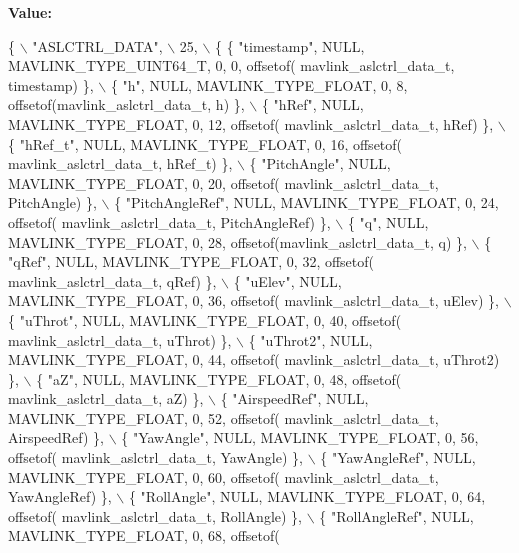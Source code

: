 {\bfseries Value\+:}
\begin{DoxyCode}
\{ \(\backslash\)
    \textcolor{stringliteral}{"ASLCTRL\_DATA"}, \(\backslash\)
    25, \(\backslash\)
    \{  \{ \textcolor{stringliteral}{"timestamp"}, NULL, MAVLINK_TYPE_UINT64_T, 0, 0, offsetof(
      mavlink_aslctrl_data_t, timestamp) \}, \(\backslash\)
         \{ \textcolor{stringliteral}{"h"}, NULL, MAVLINK_TYPE_FLOAT, 0, 8, offsetof(mavlink_aslctrl_data_t, h) \}, \(\backslash\)
         \{ \textcolor{stringliteral}{"hRef"}, NULL, MAVLINK_TYPE_FLOAT, 0, 12, offsetof(
      mavlink_aslctrl_data_t, hRef) \}, \(\backslash\)
         \{ \textcolor{stringliteral}{"hRef\_t"}, NULL, MAVLINK_TYPE_FLOAT, 0, 16, offsetof(
      mavlink_aslctrl_data_t, hRef\_t) \}, \(\backslash\)
         \{ \textcolor{stringliteral}{"PitchAngle"}, NULL, MAVLINK_TYPE_FLOAT, 0, 20, offsetof(
      mavlink_aslctrl_data_t, PitchAngle) \}, \(\backslash\)
         \{ \textcolor{stringliteral}{"PitchAngleRef"}, NULL, MAVLINK_TYPE_FLOAT, 0, 24, offsetof(
      mavlink_aslctrl_data_t, PitchAngleRef) \}, \(\backslash\)
         \{ \textcolor{stringliteral}{"q"}, NULL, MAVLINK_TYPE_FLOAT, 0, 28, offsetof(mavlink_aslctrl_data_t, q) \}, \(\backslash\)
         \{ \textcolor{stringliteral}{"qRef"}, NULL, MAVLINK_TYPE_FLOAT, 0, 32, offsetof(
      mavlink_aslctrl_data_t, qRef) \}, \(\backslash\)
         \{ \textcolor{stringliteral}{"uElev"}, NULL, MAVLINK_TYPE_FLOAT, 0, 36, offsetof(
      mavlink_aslctrl_data_t, uElev) \}, \(\backslash\)
         \{ \textcolor{stringliteral}{"uThrot"}, NULL, MAVLINK_TYPE_FLOAT, 0, 40, offsetof(
      mavlink_aslctrl_data_t, uThrot) \}, \(\backslash\)
         \{ \textcolor{stringliteral}{"uThrot2"}, NULL, MAVLINK_TYPE_FLOAT, 0, 44, offsetof(
      mavlink_aslctrl_data_t, uThrot2) \}, \(\backslash\)
         \{ \textcolor{stringliteral}{"aZ"}, NULL, MAVLINK_TYPE_FLOAT, 0, 48, offsetof(
      mavlink_aslctrl_data_t, aZ) \}, \(\backslash\)
         \{ \textcolor{stringliteral}{"AirspeedRef"}, NULL, MAVLINK_TYPE_FLOAT, 0, 52, offsetof(
      mavlink_aslctrl_data_t, AirspeedRef) \}, \(\backslash\)
         \{ \textcolor{stringliteral}{"YawAngle"}, NULL, MAVLINK_TYPE_FLOAT, 0, 56, offsetof(
      mavlink_aslctrl_data_t, YawAngle) \}, \(\backslash\)
         \{ \textcolor{stringliteral}{"YawAngleRef"}, NULL, MAVLINK_TYPE_FLOAT, 0, 60, offsetof(
      mavlink_aslctrl_data_t, YawAngleRef) \}, \(\backslash\)
         \{ \textcolor{stringliteral}{"RollAngle"}, NULL, MAVLINK_TYPE_FLOAT, 0, 64, offsetof(
      mavlink_aslctrl_data_t, RollAngle) \}, \(\backslash\)
         \{ \textcolor{stringliteral}{"RollAngleRef"}, NULL, MAVLINK_TYPE_FLOAT, 0, 68, offsetof(

\end{DoxyCode}
